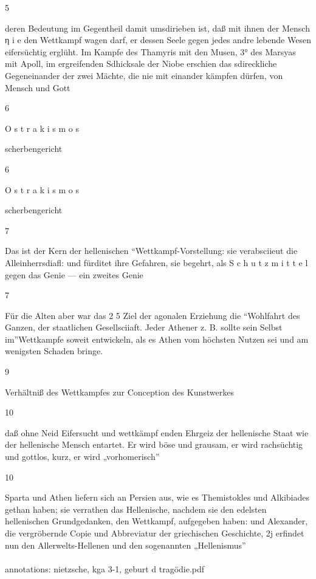 \documentclass[
  letterpaper,
  DIV=11,
  numbers=noendperiod]{scrartcl}
\makeatletter
\let\oldparagraph\paragraph
\renewcommand{\paragraph}{
    \@ifstar
      \xxxParagraphStar
      \xxxParagraphNoStar
  }
\newcommand{\xxxParagraphStar}[1]{\oldparagraph*{#1}\mbox{}}
\newcommand{\xxxParagraphNoStar}[1]{\oldparagraph{#1}\mbox{}}
\makeatother
\begin{document}
5

deren Bedeutung im Gegentheil damit umsdirieben ist, daß mit ihnen der
Mensch η i e den Wettkampf wagen darf, er dessen Seele gegen jedes andre
lebende Wesen eifersüchtig erglüht. Im Kampfe des Thamyris mit den
Musen, 3° des Marsyas mit Apoll, im ergreifenden Sdhicksale der Niobe
erschien das sdireckliche Gegeneinander der zwei Mächte, die nie mit
einander kämpfen dürfen, von Mensch und Gott

6

O s t r a k i s m o s

scherbengericht

6

O s t r a k i s m o s

scherbengericht

7

Das ist der Kern der hellenischen ``Wettkampf-Vorstellung: sie
verabsciieut die Alleinherrsdiafl: und fürditet ihre Gefahren, sie
begehrt, als S c h u t z m i t t e l gegen das Genie --- ein zweites
Genie

7

Für die Alten aber war das 2 5 Ziel der agonalen Erziehung die
``Wohlfahrt des Ganzen, der staatlichen Gesellsciiaft. Jeder Athener z.
B. sollte sein Selbst im''Wettkampfe soweit entwickeln, als es Athen vom
höchsten Nutzen sei und am wenigsten Schaden bringe.

9

Verhältniß des Wettkampfes zur Conception des Kunstwerkes

10

daß ohne Neid Eifersucht und wettkämpf enden Ehrgeiz der hellenische
Staat wie der hellenische Mensch entartet. Er wird böse und grausam, er
wird rachsüchtig und gottlos, kurz, er wird „vorhomerisch''

10

Sparta und Athen liefern sich an Persien aus, wie es Themistokles und
Alkibiades gethan haben; sie verrathen das Hellenische, nachdem sie den
edelsten hellenischen Grundgedanken, den Wettkampf, aufgegeben haben:
und Alexander, die vergröbernde Copie und Abbreviatur der griechischen
Geschichte, 2j erfindet nun den Allerwelts-Hellenen und den sogenannten
„Hellenismus''

\paragraph{annotations: nietzsche, kga 3-1, geburt d
tragödie.pdf}\label{annotations-nietzsche-kga-3-1-geburt-d-tragodie.pdf}
\end{document}
